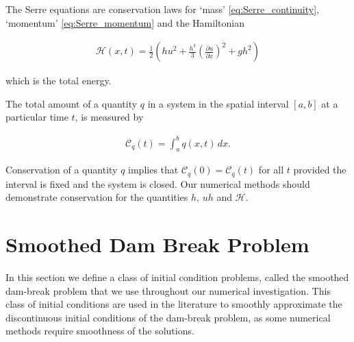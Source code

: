\documentclass[times]{elsarticle}
\begin{document}
The Serre equations are conservation laws for `mass' \eqref{eq:Serre_continuity}, `momentum' \eqref{eq:Serre_momentum} and the Hamiltonian \cite{Li-Y-2002,Green-Naghdi-1976-237}
\begin{linenomath*}
	\begin{gather}
	\label{eqn:Hamildef}
	\mathcal{H}(x,t) = \frac{1}{2} \left(hu^2 + \frac{h^3}{3} \left(\frac{\partial u}{\partial x}\right)^2 + gh^2\right)
	\end{gather}
\end{linenomath*}
which is the total energy.

The total amount of a quantity $q$ in a system in the spatial interval $[a,b]$ at a particular time $t$, is measured by
\begin{linenomath*}
\begin{gather*}
\label{eqn:Condef}
\mathcal{C}_q(t) = \int_{a}^{b} q(x,t)\, dx .
\end{gather*}
\end{linenomath*}
Conservation of a quantity $q$ implies that $\mathcal{C}_{q}(0) = \mathcal{C}_{q}(t)$ for all $t$ provided the interval is fixed and the system is closed. Our numerical methods should demonstrate conservation for the quantities $h$, $uh$ and $\mathcal{H}$.


\section{Smoothed Dam Break Problem}
\label{section:smootheddambreak}
In this section we define a class of initial condition problems, called the smoothed dam-break problem that we use throughout our numerical investigation. This class of initial conditions are used in the literature \cite{Mitsotakis-etal-2014,Mitsotakis-etal-2017} to smoothly approximate the discontinuous initial conditions of the dam-break problem, as some numerical methods require smoothness of the solutions.
\end{document}

